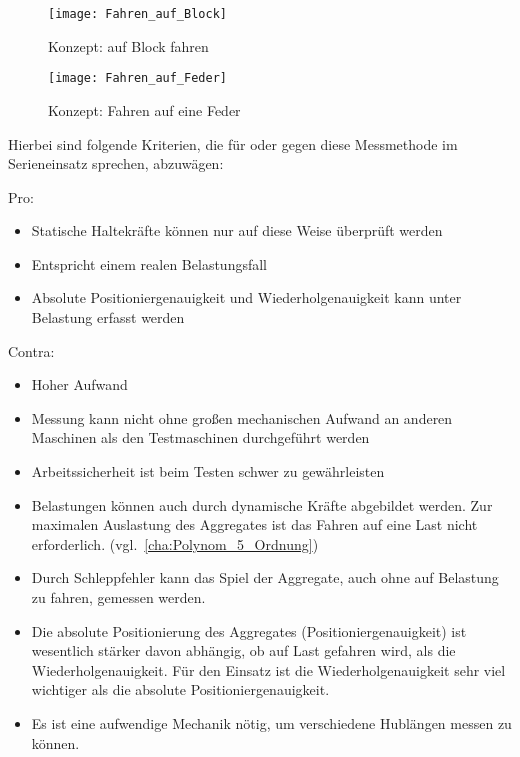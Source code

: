 \begin{figure}[H]
\centering
\begin{minipage}[b]{0.47\textwidth}
\centering
\texttt{[image: Fahren\_auf\_Block]} 
\caption{Konzept: auf Block fahren} 
\label{fig:Fahren_auf_Block}
\end{minipage}
\begin{minipage}[b]{0.47\textwidth}
\centering
\texttt{[image: Fahren\_auf\_Feder]} 
\caption{Konzept: Fahren auf eine Feder} 
\label{fig:Fahren_auf_Feder}
\end{minipage}

\end{figure}



Hierbei sind folgende Kriterien, die für oder gegen diese Messmethode im Serieneinsatz sprechen, abzuwägen:

Pro:
\begin{itemize}
 \item Statische Haltekräfte können nur auf diese Weise überprüft werden
 \item Entspricht einem realen Belastungsfall
 \item Absolute Positioniergenauigkeit und Wiederholgenauigkeit kann unter Belastung erfasst werden
\end{itemize}


Contra:
\begin{itemize}
 \item Hoher Aufwand
 \item Messung kann nicht ohne großen mechanischen Aufwand an anderen Maschinen als den Testmaschinen durchgeführt werden
  \item Arbeitssicherheit ist beim Testen schwer zu gewährleisten
  \item Belastungen können auch durch dynamische Kräfte abgebildet werden. Zur maximalen Auslastung des Aggregates ist das Fahren auf eine Last nicht erforderlich. (vgl.~\ref{cha:Polynom_5_Ordnung}) 
  \item Durch Schleppfehler kann das Spiel der Aggregate, auch ohne auf Belastung zu fahren, gemessen werden.
  \item Die absolute Positionierung des Aggregates (Positioniergenauigkeit) ist wesentlich stärker davon abhängig, ob auf Last gefahren wird, als die Wiederholgenauigkeit. Für den Einsatz ist die Wiederholgenauigkeit sehr viel wichtiger als die absolute Positioniergenauigkeit. 
  \item Es ist eine aufwendige Mechanik nötig, um verschiedene Hublängen messen zu können.
\end{itemize}

